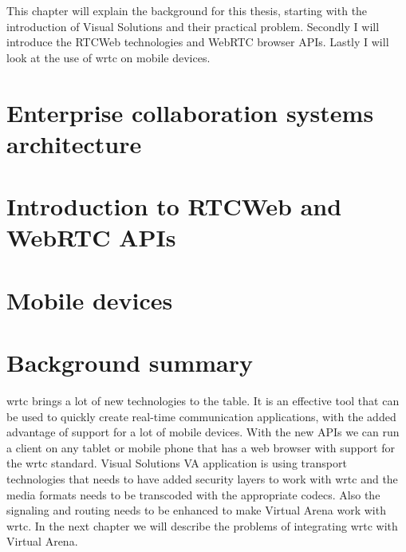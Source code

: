 
This chapter will explain the background for this thesis, starting with the introduction of Visual Solutions and their practical problem. Secondly I will introduce the RTCWeb technologies and WebRTC browser APIs. Lastly I will look at the use of \gls{wrtc} on mobile devices.%

\section{Enterprise collaboration systems architecture}


\newpage
\section{Introduction to RTCWeb and WebRTC APIs}


\newpage
\section{Mobile devices}


% 

% 

\newpage
\section{Background summary}
\gls{wrtc} brings a lot of new technologies to the table. It is an effective tool that can be used to quickly create real-time communication applications, with the added advantage of support for a lot of mobile devices. With the new APIs we can run a client on any tablet or mobile phone that has a web browser with support for the \gls{wrtc} standard. %
Visual Solutions VA application is using transport technologies that needs to have added security layers to work with \gls{wrtc} and the media formats needs to be transcoded with the appropriate codecs. Also the signaling and routing needs to be enhanced to make Virtual Arena work with \gls{wrtc}. In the next chapter we will describe the problems of integrating \gls{wrtc} with Virtual Arena.